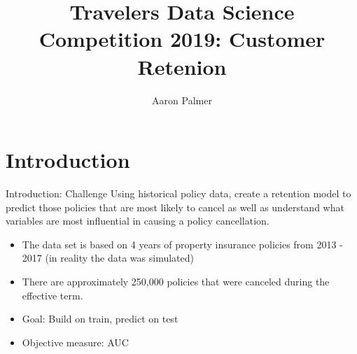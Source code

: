 \documentclass{beamer}
\title[]{Travelers Data Science Competition 2019: Customer Retenion}
\author{Aaron Palmer}
\begin{document}
\begin{frame}
  \maketitle
\end{frame}


\section{Introduction}
\begin{frame}{Introduction: Challenge}
Using historical policy data, create a retention model to predict those policies that are most likely to cancel as well as understand what variables are most influential in causing a policy cancellation.
\begin{itemize}
	\item The data set is based on 4 years of property insurance policies from 2013 - 2017 (in reality the data was simulated)
	\item There are approximately 250,000 policies that were canceled during the effective term.
	\item Goal: Build on train, predict on test
	\item Objective measure: AUC
\end{itemize}
\end{frame}
\end{document}
